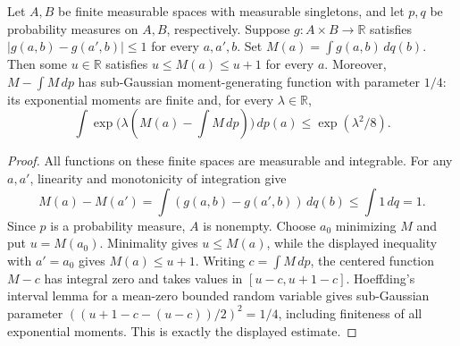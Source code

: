 \begin{lemma}
Let $A,B$ be finite measurable spaces with measurable singletons, and let
$p,q$ be probability measures on $A,B$, respectively. Suppose
$g:A\times B\to\mathbb R$ satisfies
$|g(a,b)-g(a',b)|\le 1$ for every $a,a',b$.
Set $M(a)=\int g(a,b)\,dq(b)$. Then some $u\in\mathbb R$ satisfies
$u\le M(a)\le u+1$ for every $a$. Moreover, $M-\int M\,dp$ has
sub-Gaussian moment-generating function with parameter $1/4$: its
exponential moments are finite and, for every $\lambda\in\mathbb R$,
\[
\int \exp\bigl(\lambda(M(a)-\textstyle\int M\,dp)\bigr)\,dp(a)
\le \exp(\lambda^2/8).
\]
\end{lemma}
\begin{proof}
All functions on these finite spaces are measurable and integrable.
For any $a,a'$, linearity and monotonicity of integration give
\[
M(a)-M(a')=\int(g(a,b)-g(a',b))\,dq(b)\le\int 1\,dq=1.
\]
Since $p$ is a probability measure, $A$ is nonempty. Choose $a_0$ minimizing
$M$ and put $u=M(a_0)$. Minimality gives $u\le M(a)$, while the displayed
inequality with $a'=a_0$ gives $M(a)\le u+1$.
Writing $c=\int M\,dp$, the centered function $M-c$ has integral zero
and takes values in $[u-c,u+1-c]$. Hoeffding's interval lemma for a
mean-zero bounded random variable gives sub-Gaussian parameter
$((u+1-c-(u-c))/2)^2=1/4$, including finiteness of all exponential
moments. This is exactly the displayed estimate.
\end{proof}
